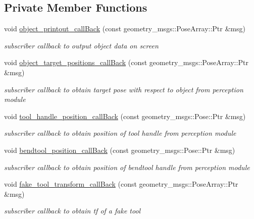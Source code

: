 \subsection*{Private Member Functions}
\begin{DoxyCompactItemize}
\item 
void \hyperlink{structManipulate_a85f27b19ae91a8829d0864fb2a0329c2}{object\+\_\+printout\+\_\+call\+Back} (const geometry\+\_\+msgs\+::\+Pose\+Array\+::\+Ptr \&msg)
\begin{DoxyCompactList}\small\item\em subscriber callback to output object data on screen \end{DoxyCompactList}\item 
void \hyperlink{structManipulate_a7d9d1528dc39485735d019244b0a7fca}{object\+\_\+target\+\_\+positions\+\_\+call\+Back} (const geometry\+\_\+msgs\+::\+Pose\+Array\+::\+Ptr \&msg)
\begin{DoxyCompactList}\small\item\em subscriber callback to obtain target pose with respect to object from perception module \end{DoxyCompactList}\item 
void \hyperlink{structManipulate_abfa252d6d9085b184ba68156aac3d308}{tool\+\_\+handle\+\_\+position\+\_\+call\+Back} (const geometry\+\_\+msgs\+::\+Pose\+::\+Ptr \&msg)
\begin{DoxyCompactList}\small\item\em subscriber callback to obtain position of tool handle from perception module \end{DoxyCompactList}\item 
void \hyperlink{structManipulate_a0fb363bbdf2dd806b20206e32fda91ac}{bendtool\+\_\+position\+\_\+call\+Back} (const geometry\+\_\+msgs\+::\+Pose\+::\+Ptr \&msg)
\begin{DoxyCompactList}\small\item\em subscriber callback to obtain position of bendtool handle from perception module \end{DoxyCompactList}\item 
void \hyperlink{structManipulate_a6482d959b897def2c9999acaa53b191a}{fake\+\_\+tool\+\_\+transform\+\_\+call\+Back} (const geometry\+\_\+msgs\+::\+Pose\+Array\+::\+Ptr \&msg)
\begin{DoxyCompactList}\small\item\em subscriber callback to obtain tf of a fake tool \end{DoxyCompactList}\item 

\end{DoxyCompactItemize}
